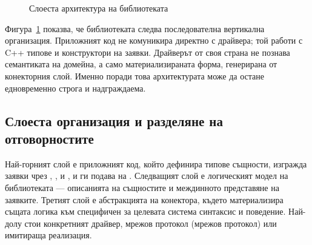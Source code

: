 \begin{figure}[H]
\centering
{}
\caption{Слоеста архитектура на библиотеката}
\label{fig:architecture_layers}
\end{figure}

Фигура~\ref{fig:architecture_layers} показва, че библиотеката следва последователна вертикална организация. Приложният код не комуникира директно с драйвера; той работи с C++ типове и конструктори на заявки. Драйверът от своя страна не познава семантиката на домейна, а само материализираната форма, генерирана от конекторния слой. Именно поради това архитектурата може да остане едновременно строга и надграждаема.

\subsection{Слоеста организация и разделяне на отговорностите}

Най-горният слой е приложният код, който дефинира типове същности, изгражда заявки чрез , ,  и , и ги подава на . Следващият слой е логическият модел на библиотеката --- описанията на същностите и междинното представяне на заявките. Третият слой е абстракцията на конектора, където  материализира същата логика към специфичен за целевата система синтаксис и поведение. Най-долу стои конкретният драйвер, мрежов протокол (мрежов протокол) или имитираща реализация.

